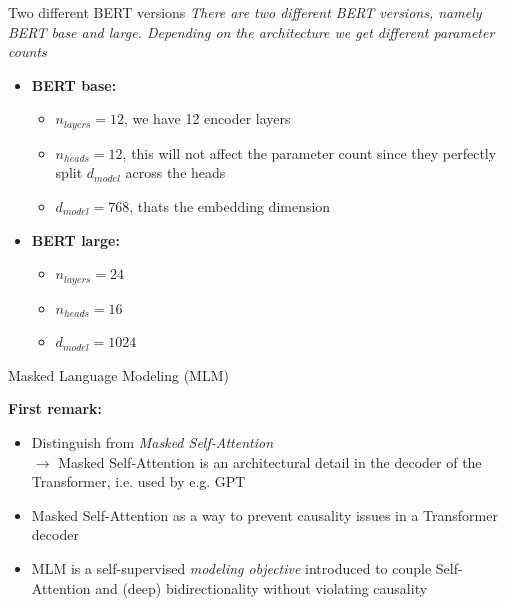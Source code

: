 
\begin{frame}{Two different BERT versions}
\textit{There are two different BERT versions, namely BERT base and large. Depending on the architecture we get different parameter counts} 

\begin{itemize}
	\item \textbf{BERT base:}
	\begin{itemize}
		\item $n_{layers} = 12$, we have 12 encoder layers
		\item $n_{heads} = 12$, this will not affect the parameter count since they perfectly split $d_{model}$ across the heads
		\item $d_{model} = 768$, thats the embedding dimension
	\end{itemize}

	\item \textbf{BERT large:}
	\begin{itemize}
		\item $n_{layers} = 24$
		\item $n_{heads} = 16$
		\item $d_{model} = 1024$
	\end{itemize}
\end{itemize}
	
\end{frame}



\begin{frame}{Masked Language Modeling (MLM)}

\vfill

\textbf{First remark:}

\begin{itemize}
	\item Distinguish from \textit{Masked Self-Attention}\\ 
				$\to$ Masked Self-Attention is an architectural detail in the decoder of the Transformer, i.e. used by e.g. GPT
	\item Masked Self-Attention as a way to prevent causality issues in a Transformer decoder 
	\item MLM is a self-supervised \textit{modeling objective} introduced to couple Self-Attention and (deep) bidirectionality without violating causality
\end{itemize}

\vfill

\end{frame}

